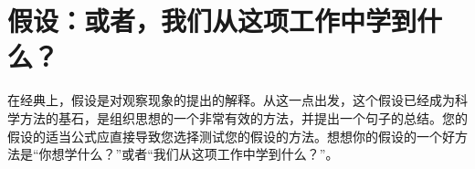 


\section{假设：或者，我们从这项工作中学到什么？}
在经典上，假设是对观察现象的提出的解释。从这一点出发，这个假设已经成为科学方法的基石，是组织思想的一个非常有效的方法，并提出一个句子的总结。您的假设的适当公式应直接导致您选择测试您的假设的方法。想想你的假设的一个好方法是“你想学什么？”或者“我们从这项工作中学到什么？”。

